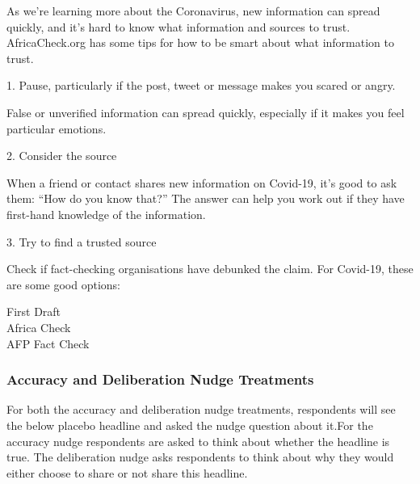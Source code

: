 \documentclass[letterpaper, 12pt, parskip=full,]{scrartcl}
\begin{document}
As we're learning more about the Coronavirus, new information can spread quickly, and it's hard to know what information and sources to trust. AfricaCheck.org has some tips for how to be smart about what information to trust. 

1. Pause, particularly if the post, tweet or message makes you scared or angry. 

False or unverified information can spread quickly, especially if it makes you feel particular emotions.

2. Consider the source

When a friend or contact shares new information on Covid-19, it’s good to ask them: “How do you know that?” The answer can help you work out if they have first-hand knowledge of the information.

3. Try to find a trusted source

Check if fact-checking organisations have debunked the claim. For Covid-19, these are some good options:

First Draft\\
Africa Check\\
AFP Fact Check

\subsubsection{Accuracy and Deliberation Nudge Treatments}\label{sec:nudge}

For both the accuracy and deliberation nudge treatments, respondents will see the below placebo headline and asked the nudge question about it.For the accuracy nudge respondents are asked to think about whether the headline is true. The deliberation nudge asks respondents to think about why they would either choose to share or not share this headline.
\end{document}
